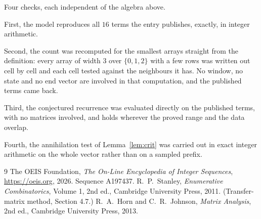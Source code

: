 \documentclass[11pt,a4paper]{article}
\theoremstyle{plain}
\theoremstyle{definition}
\begin{document}
Four checks, each independent of the algebra above.

First, the model reproduces all $16$ terms the entry publishes, exactly, in integer
arithmetic.

Second, the count was recomputed for the smallest arrays straight from the definition: every
array of width $3$ over $\{0,1,2\}$ with a few rows was written out cell by cell and each cell
tested against the neighbours it has. No window, no state and no end vector are involved in that
computation, and the published terms came back.

Third, the conjectured recurrence was evaluated directly on the published terms, with no
matrices involved, and holds wherever the proved range and the data overlap.

Fourth, the annihilation test of Lemma~\ref{lem:crit} was carried out in exact integer
arithmetic on the whole vector rather than on a sampled prefix.

\begin{thebibliography}{9}
 The OEIS Foundation, \emph{The On-Line Encyclopedia of Integer
Sequences}, \url{https://oeis.org}, 2026. Sequence A197437.
 R.~P.~Stanley, \emph{Enumerative Combinatorics}, Volume 1, 2nd ed.,
Cambridge University Press, 2011. (Transfer-matrix method, Section 4.7.)
 R.~A.~Horn and C.~R.~Johnson, \emph{Matrix Analysis}, 2nd ed., Cambridge
University Press, 2013.
\end{thebibliography}
\end{document}
